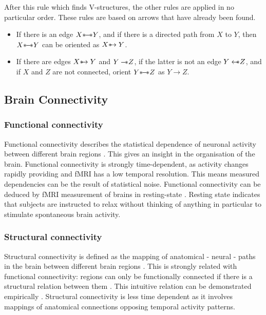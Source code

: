 \documentclass[a4paper, 10pt, english, onecolumn]{article}
\def \srightarrow {\text{\textasteriskcentered}\hspace{-0.62em}\rightarrow}
\def \sleftarrow {\leftarrow\hspace{-0.62em}\text{\textasteriskcentered}}
\def \sleftline {-\hspace{-0.40em}\text{\textasteriskcentered}}
\def \sline {\text{\textasteriskcentered}\hspace{-0.38em}-\hspace{-0.4em}\text{\textasteriskcentered}}
\begin{document}
After this rule which finds V-structures, the other rules are applied in no particular order. These rules are based on arrows that have already been found.
\begin{itemize}
\item If there is an edge $X \sline Y$, and if there is a directed path from $X$ to $Y$, then $X \sline Y$ can be oriented as $X \srightarrow Y$.
\item If there are edges $X \srightarrow Y$ and $Y \sleftline Z$, if the latter is not an edge $Y \sleftarrow Z$, and if $X$ and $Z$ are not connected, orient $Y \sline Z$ as $Y \rightarrow Z$. 
\end{itemize}


\subsection{Brain Connectivity}

\subsubsection{Functional connectivity}
Functional connectivity describes the statistical dependence of neuronal activity between different brain regions \cite{friston1993functional}.
This gives an insight in the organisation of the brain.
Functional connectivity is strongly time-dependent, as activity changes rapidly providing and fMRI has a low temporal resolution.
This means measured dependencies can be the result of statistical noise.
Functional connectivity can be deduced by fMRI measurement of brains in resting-state \cite{Lowe2000, doria2010, Bullmore2009}.
Resting state indicates that subjects are instructed to relax without thinking of anything in particular to stimulate spontaneous brain activity.

\subsubsection{Structural connectivity}
Structural connectivity is defined as the mapping of anatomical - neural - paths in the brain between different brain regions \cite{friston1994}.
This is strongly related with functional connectivity: regions can only be functionally connected if there is a structural relation between them \cite{cabral2012}.
This intuitive relation can be demonstrated empirically \cite{vandenheuvel2009}.
Structural connectivity is less time dependent as it involves mappings of anatomical connections opposing temporal activity patterns.
\end{document}
